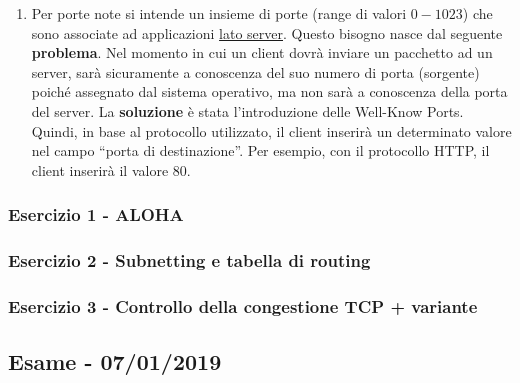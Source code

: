 \documentclass[a4paper]{article}
\newcommand{\dquotes}[1]{``#1''}
\begin{document}
\begin{enumerate}
		\item Per porte note si intende un insieme di porte (range di valori $0-1023$) che sono associate ad applicazioni \underline{lato server}. Questo bisogno nasce dal seguente \textbf{problema}.\newline
		Nel momento in cui un client dovrà inviare un pacchetto ad un server, sarà sicuramente a conoscenza del suo numero di porta (sorgente) poiché assegnato dal sistema operativo, ma non sarà a conoscenza della porta del server.\newline
		La \textbf{soluzione} è stata l'introduzione delle Well-Know Ports. Quindi, in base al protocollo utilizzato, il client inserirà un determinato valore nel campo \dquotes{porta di destinazione}. Per esempio, con il protocollo HTTP, il client inserirà il valore 80.
	\end{enumerate}
	
	\subsubsection{Esercizio 1 - ALOHA}
	
	\subsubsection{Esercizio 2 - Subnetting e tabella di routing}
	
	\subsubsection{Esercizio 3 - Controllo della congestione TCP + variante}
	
	\newpage

	\subsection[\textbf{Esame - 07/01/2019}]{Esame - 07/01/2019}
\end{document}
